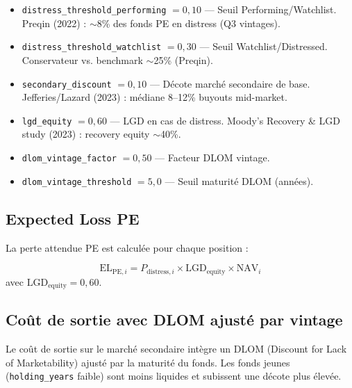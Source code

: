 \documentclass[12pt,a4paper]{article}
\begin{document}
\begin{definitionbox}
\begin{itemize}[nosep]
    \item \texttt{distress\_threshold\_performing} $= 0{,}10$ --- Seuil Performing/Watchlist.
          Preqin (2022) : $\sim$8\% des fonds PE en distress (Q3 vintages).
    \item \texttt{distress\_threshold\_watchlist} $= 0{,}30$ --- Seuil Watchlist/Distressed.
          Conservateur vs. benchmark $\sim$25\% (Preqin).
    \item \texttt{secondary\_discount} $= 0{,}10$ --- D\'{e}cote march\'{e} secondaire de base.
          Jefferies/Lazard (2023) : m\'{e}diane 8--12\% buyouts mid-market.
    \item \texttt{lgd\_equity} $= 0{,}60$ --- LGD en cas de distress.
          Moody's Recovery \& LGD study (2023) : recovery equity $\sim$40\%.
    \item \texttt{dlom\_vintage\_factor} $= 0{,}50$ --- Facteur DLOM vintage.
    \item \texttt{dlom\_vintage\_threshold} $= 5{,}0$ --- Seuil maturit\'{e} DLOM (ann\'{e}es).
\end{itemize}
\end{definitionbox}

\subsection{Expected Loss PE}

La perte attendue PE est calcul\'{e}e pour chaque position :

\begin{formulebox}
\begin{equation}
\mathrm{EL}_{\mathrm{PE},i} = P_{\mathrm{distress},i} \times \mathrm{LGD}_{\mathrm{equity}} \times \mathrm{NAV}_i \label{eq:el_pe}
\end{equation}
avec $\mathrm{LGD}_{\mathrm{equity}} = 0{,}60$.
\end{formulebox}

\subsection{Co\^{u}t de sortie avec DLOM ajust\'{e} par vintage}
\label{sec:dlom}

Le co\^{u}t de sortie sur le march\'{e} secondaire int\`{e}gre un DLOM (Discount for Lack of
Marketability) ajust\'{e} par la maturit\'{e} du fonds. Les fonds jeunes (\texttt{holding\_years}
faible) sont moins liquides et subissent une d\'{e}cote plus \'{e}lev\'{e}e.
\end{document}

